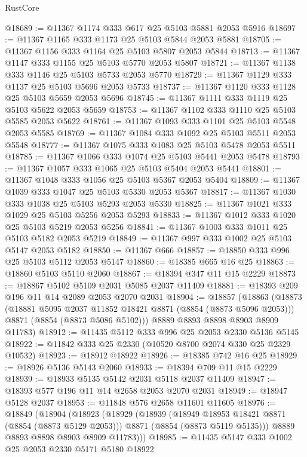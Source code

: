 \begin{lexlean}{RustCore}
\begin{coremodule}
@18689 := @11367 @1174 @333 @617 @25 @5103 @5881 @2053 @5916
@18697 := @11367 @1165 @333 @1173 @25 @5103 @5844 @2053 @5881
@18705 := @11367 @1156 @333 @1164 @25 @5103 @5807 @2053 @5844
@18713 := @11367 @1147 @333 @1155 @25 @5103 @5770 @2053 @5807
@18721 := @11367 @1138 @333 @1146 @25 @5103 @5733 @2053 @5770
@18729 := @11367 @1129 @333 @1137 @25 @5103 @5696 @2053 @5733
@18737 := @11367 @1120 @333 @1128 @25 @5103 @5659 @2053 @5696
@18745 := @11367 @1111 @333 @1119 @25 @5103 @5622 @2053 @5659
@18753 := @11367 @1102 @333 @1110 @25 @5103 @5585 @2053 @5622
@18761 := @11367 @1093 @333 @1101 @25 @5103 @5548 @2053 @5585
@18769 := @11367 @1084 @333 @1092 @25 @5103 @5511 @2053 @5548
@18777 := @11367 @1075 @333 @1083 @25 @5103 @5478 @2053 @5511
@18785 := @11367 @1066 @333 @1074 @25 @5103 @5441 @2053 @5478
@18793 := @11367 @1057 @333 @1065 @25 @5103 @5404 @2053 @5441
@18801 := @11367 @1048 @333 @1056 @25 @5103 @5367 @2053 @5404
@18809 := @11367 @1039 @333 @1047 @25 @5103 @5330 @2053 @5367
@18817 := @11367 @1030 @333 @1038 @25 @5103 @5293 @2053 @5330
@18825 := @11367 @1021 @333 @1029 @25 @5103 @5256 @2053 @5293
@18833 := @11367 @1012 @333 @1020 @25 @5103 @5219 @2053 @5256
@18841 := @11367 @1003 @333 @1011 @25 @5103 @5182 @2053 @5219
@18849 := @11367 @997 @333 @1002 @25 @5103 @5147 @2053 @5182
@18850 := @11367 @666
@18857 := @18850 @333 @996 @25 @5103 @5112 @2053 @5147
@18860 := @18385 @665 @16 @25
@18863 := @18860 @5103 @5110 @2060
@18867 := @18394 @347 @11 @15 @2229
@18873 := @18867 @5102 @5109 @2031 @5085 @2037 @11409
@18881 := @18393 @209 @196 @11 @14 @2089 @2053 @2070 @2031
@18904 := @18857
    (@18863
      (@18873
        (@18881 @5095 @2037 @11852 @18421 @8871 (@8854 (@8873 @5096 @2053)))
        @8871
        (@8854 (@8873 @5086 @5102)))
      @8889
      @8893
      @8898
      @8903
      @8909
      @11783)
@18912 := @11435 @5112 @333 @996 @25 @2053 @2330 @5136 @5145
@18922 := @11842 @333 @25 @2330 (@10520 @8700 @2074 @330 @25 @2329 @10532)
@18923 := @18912 @18922
@18926 := @18385 @742 @16 @25
@18929 := @18926 @5136 @5143 @2060
@18933 := @18394 @709 @11 @15 @2229
@18939 := @18933 @5135 @5142 @2031 @5118 @2037 @11409
@18947 := @18393 @577 @196 @11 @14 @2658 @2053 @2070 @2031
@18949 := @18947 @5128 @2037
@18953 := @11848 @576 @2658 @11601 @11605
@18976 := @18849
    (@18904
      (@18923
        (@18929
          (@18939
            (@18949 @18953 @18421 @8871 (@8854 (@8873 @5129 @2053)))
            @8871
            (@8854 (@8873 @5119 @5135)))
          @8889
          @8893
          @8898
          @8903
          @8909
          @11783)))
@18985 := @11435 @5147 @333 @1002 @25 @2053 @2330 @5171 @5180 @18922

\end{coremodule}
\end{lexlean}
